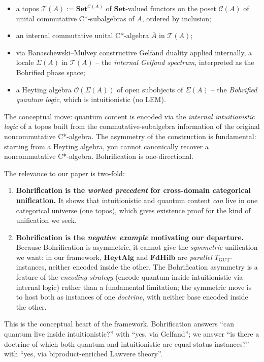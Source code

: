 \documentclass[11pt,a4paper]{article}
\theoremstyle{plain}
\theoremstyle{definition}
\theoremstyle{remark}
\newcommand{\cat}[1]{\mathbf{#1}}
\newcommand{\Set}{\cat{Set}}
\newcommand{\HeytAlg}{\cat{HeytAlg}}
\newcommand{\FdHilb}{\cat{FdHilb}}
\newcommand{\TGUT}{T_{\mathrm{GUT}}}
\begin{document}
\begin{itemize}[leftmargin=*]
\item a topos $\mathcal{T}(A) := \Set^{\mathcal{C}(A)}$ of $\Set$-valued functors on the poset $\mathcal{C}(A)$ of unital commutative C*-subalgebras of $A$, ordered by inclusion;
\item an internal commutative unital C*-algebra $\bar{A}$ in $\mathcal{T}(A)$;
\item via Banaschewski--Mulvey constructive Gelfand duality applied internally, a locale $\Sigma(A)$ in $\mathcal{T}(A)$ -- the \emph{internal Gelfand spectrum}, interpreted as the Bohrified phase space;
\item a Heyting algebra $\mathcal{O}(\Sigma(A))$ of open subobjects of $\Sigma(A)$ -- the \emph{Bohrified quantum logic}, which is intuitionistic (no LEM).
\end{itemize}

The conceptual move: quantum content is encoded via the \emph{internal intuitionistic logic} of a topos built from the commutative-subalgebra information of the original noncommutative C*-algebra. The asymmetry of the construction is fundamental: starting from a Heyting algebra, you cannot canonically recover a noncommutative C*-algebra. Bohrification is one-directional.

The relevance to our paper is two-fold:

\begin{enumerate}[leftmargin=*]
\item \textbf{Bohrification is the \emph{worked precedent} for cross-domain categorical unification.} It shows that intuitionistic and quantum content \emph{can} live in one categorical universe (one topos), which gives existence proof for the kind of unification we seek.

\item \textbf{Bohrification is the \emph{negative example} motivating our departure.} Because Bohrification is asymmetric, it cannot give the \emph{symmetric} unification we want: in our framework, $\HeytAlg$ and $\FdHilb$ are \emph{parallel} $\TGUT$-instances, neither encoded inside the other. The Bohrification asymmetry is a feature of the \emph{encoding strategy} (encode quantum inside intuitionistic via internal logic) rather than a fundamental limitation; the symmetric move is to host both as instances of one \emph{doctrine}, with neither base encoded inside the other.
\end{enumerate}

This is the conceptual heart of the framework. Bohrification answers ``can quantum live inside intuitionistic?'' with ``yes, via Gelfand''; we answer ``is there a doctrine of which both quantum and intuitionistic are equal-status instances?'' with ``yes, via biproduct-enriched Lawvere theory''.
\end{document}

